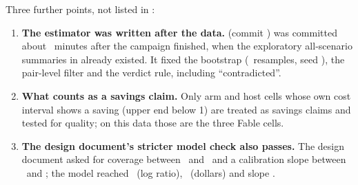 Three further points, not listed in :
\begin{enumerate}[leftmargin=1.4em,resume]
  \item \textbf{The estimator was written after the data.}  (commit
    \code{\ConfirmSha}) was committed about \ConfirmAfterMin\ minutes after the campaign finished, when the
    exploratory all-scenario summaries in  already existed. It fixed the bootstrap (\Boot\
    resamples, seed \BootSeed), the pair-level filter and the verdict rule, including ``contradicted''.
  \item \textbf{What counts as a savings claim.} Only arm and host cells whose own cost interval shows a saving
    (upper end below 1) are treated as savings claims and tested for quality; on this data those are the three
    Fable cells.
  \item \textbf{The design document's stricter model check also passes.} The design document asked for
    coverage between \DesignCovLow\ and \DesignCovHigh\ and a calibration slope between \DesignSlopeLow\ and
    \DesignSlopeHigh; the model reached \MCCovLog\ (log ratio), \MCCovUSD\ (dollars) and slope \MCSlope.
\end{enumerate}

{\small}

{\small}
